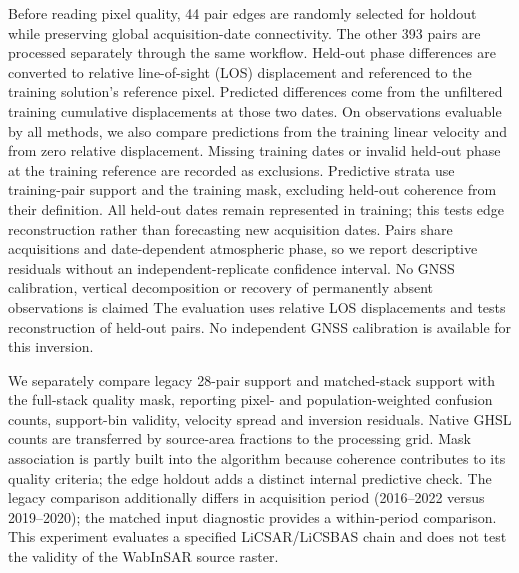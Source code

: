\documentclass[pdflatex,sn-nature]{sn-jnl}
\providecommand{\DIFadd}[1]{{\protect\color{blue} \sf #1}} %
\providecommand{\DIFdel}[1]{{\protect\color{red} \scriptsize #1}} %
\providecommand{\DIFaddbegin}{} %
\providecommand{\DIFaddend}{} %
\providecommand{\DIFdelbegin}{} %
\providecommand{\DIFdelend}{} %
\begin{document}
Before reading pixel quality, 44 pair edges are randomly selected for holdout while preserving global acquisition-date connectivity. The other 393 pairs are processed separately through the same workflow. Held-out phase differences are converted to relative line-of-sight (LOS) displacement and referenced to the training solution's reference pixel. Predicted differences come from the unfiltered training cumulative displacements at those two dates. On observations evaluable by all methods, we also compare predictions from the training linear velocity and from zero relative displacement. Missing training dates or invalid held-out phase at the training reference are recorded as exclusions. Predictive strata use training-pair support and the training mask, excluding held-out coherence from their definition. All held-out dates remain represented in training; this tests edge reconstruction rather than forecasting new acquisition dates. Pairs share acquisitions and date-dependent atmospheric phase, so we report descriptive residuals without an independent-replicate confidence interval. \DIFdelbegin \DIFdel{No GNSS calibration, vertical decomposition or recovery of permanently absent observations is claimed}\DIFdelend \DIFaddbegin \DIFadd{The evaluation uses relative LOS displacements and tests reconstruction of held-out pairs. No independent GNSS calibration is available for this inversion}\DIFaddend .

We separately compare legacy 28-pair support and matched-stack support with the full-stack quality mask, reporting pixel- and population-weighted confusion counts, support-bin validity, velocity spread and inversion residuals. Native GHSL counts are transferred by source-area fractions to the processing grid. Mask association is partly built into the algorithm because coherence contributes to its quality criteria; the edge holdout adds a distinct internal predictive check. The legacy comparison additionally differs in acquisition period (2016--2022 versus 2019--2020); the matched input diagnostic provides a within-period comparison. This experiment evaluates a specified LiCSAR/LiCSBAS chain and does not test the validity of the WabInSAR source raster.
\end{document}
